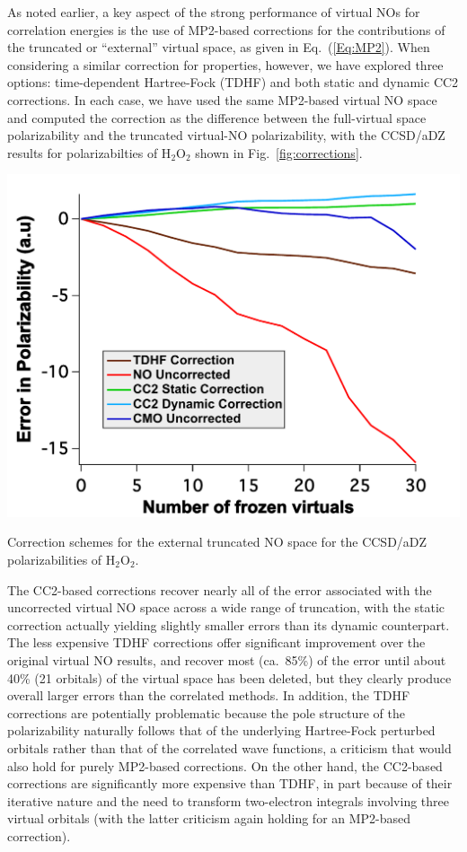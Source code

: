 As noted earlier, a key aspect of the strong performance of virtual NOs for
correlation energies is the use of MP2-based corrections for the contributions
of the truncated or ``external'' virtual space, as given in
Eq.~(\ref{Eq:MP2}).  When considering a similar correction for properties,
however, we have explored three options: time-dependent Hartree-Fock (TDHF)
and both static and dynamic CC2\cite{Christiansen95:CC2} corrections.  In each
case, we have used the same MP2-based virtual NO space and computed the
correction as the difference between the full-virtual space polarizability and
the truncated virtual-NO polarizability, with the CCSD/aDZ results for
polarizabilties of H$_2$O$_2$ shown in Fig.~\ref{fig:corrections}.
\begin{MyFigure}[h!]
\centering
\includegraphics[width=0.6\linewidth,natwidth=610,natheight=642]{figures_fvno/correctn.pdf}
\caption{{\footnotesize Correction schemes for the external truncated
NO space for the CCSD/aDZ polarizabilities of H$_2$O$_2$.}}
\label{fig:corrections}
\end{MyFigure}
The CC2-based corrections recover nearly all of the error associated with the
uncorrected virtual NO space across a wide range of truncation, with the
static correction actually yielding slightly smaller errors than its dynamic
counterpart.  The less expensive TDHF corrections offer significant
improvement over the original virtual NO results, and recover most (ca.\ 85\%)
of the error until about 40\% (21 orbitals) of the virtual space has been
deleted, but they clearly produce overall larger errors than the correlated
methods.  In addition, the TDHF corrections are potentially problematic
because the pole structure of the polarizability naturally follows that of the
underlying Hartree-Fock perturbed orbitals rather than that of the correlated
wave functions,\cite{Aiga96,Hattig95,Rice91} a criticism that would also hold
for purely MP2-based corrections.  On the other hand, the CC2-based
corrections are significantly more expensive than TDHF, in part because of
their iterative nature and the
need to transform two-electron integrals involving three virtual orbitals
(with the latter criticism again holding for an MP2-based correction).

